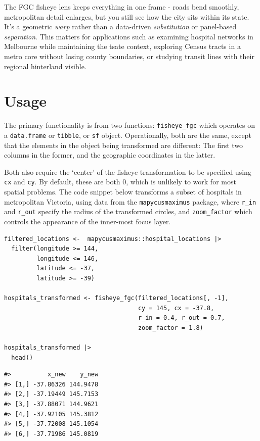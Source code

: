 The FGC fisheye lens keeps everything in one frame - roads bend smoothly, metropolitan detail enlarges, but you still see how the city sits within its state. It's a geometric \emph{warp} rather than a data-driven \emph{substitution} or panel-based \emph{separation}. This matters for applications such as examining hospital networks in Melbourne while maintaining the tsate context, exploring Census tracts in a metro core without losing county boundaries, or studying transit lines with their regional hinterland visible.

\section{Usage}\label{usage}

The primary functionality is from two functions: \texttt{fisheye\_fgc} which operates on a \texttt{data.frame} or \texttt{tibble}, or \texttt{sf} object. Operationally, both are the same, except that the elements in the object being transformed are different: The first two columns in the former, and the geographic coordinates in the latter.

Both also require the `center' of the fisheye transformation to be specified using \texttt{cx} and \texttt{cy}. By default, these are both 0, which is unlikely to work for most spatial problems. The code snippet below transforms a subset of hospitals in metropolitan Victoria, using data from the \texttt{mapycusmaximus} package, where \texttt{r\_in} and \texttt{r\_out} specify the radius of the transformed circles, and \texttt{zoom\_factor} which controls the appearance of the inner-most focus layer.

\begin{verbatim}
filtered_locations <-  mapycusmaximus::hospital_locations |>
  filter(longitude >= 144, 
         longitude <= 146, 
         latitude <= -37, 
         latitude >= -39)

hospitals_transformed <- fisheye_fgc(filtered_locations[, -1], 
                                     cy = 145, cx = -37.8, 
                                     r_in = 0.4, r_out = 0.7, 
                                     zoom_factor = 1.8)

hospitals_transformed |>
  head()
\end{verbatim}

\begin{verbatim}
#>          x_new    y_new
#> [1,] -37.86326 144.9478
#> [2,] -37.19449 145.7153
#> [3,] -37.88071 144.9621
#> [4,] -37.92105 145.3812
#> [5,] -37.72008 145.1054
#> [6,] -37.71986 145.0819
\end{verbatim}

